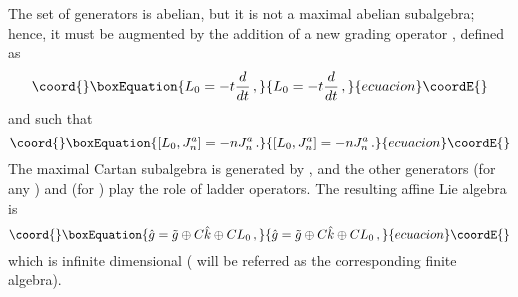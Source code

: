 \documentclass[a4paper,12pt]{report}
\begin{document}
The set of generators \coordHE{} is abelian, but it is not a maximal
abelian subalgebra; hence, it must be augmented by the addition of a new grading operator \coordHE{}, defined as
\begin{equation}\coord{}\boxEquation{
L_{0}=-t\frac{d}{dt}\,,
}{
L_{0}=-t\frac{d}{dt}\,,
}{ecuacion}\coordE{}\end{equation}
and such that
\begin{equation}\coord{}\boxEquation{
[L_{0},J_{n}^{a}]=-nJ_{n}^{a}\,.
}{
[L_{0},J_{n}^{a}]=-nJ_{n}^{a}\,.
}{ecuacion}\coordE{}\end{equation}
The maximal Cartan subalgebra is generated by \coordHE{}, and the
other generators \coordHE{} (for any \coordHE{}) and \coordHE{} (for \coordHE{}) play the role of ladder operators.
The resulting affine Lie algebra is
\begin{equation}\coord{}\boxEquation{
\hat{g}=\tilde{g}\oplus C\hat{k}\oplus C L_{0}\,,
}{
\hat{g}=\tilde{g}\oplus C\hat{k}\oplus C L_{0}\,,
}{ecuacion}\coordE{}\end{equation}
which is infinite dimensional (\coordHE{} will be referred as the corresponding finite algebra).
\end{document}
